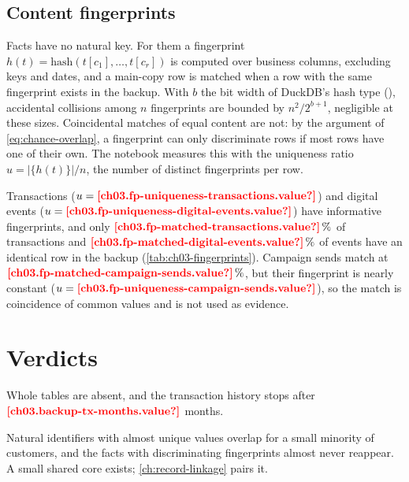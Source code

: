 

\subsection{Content fingerprints}

Facts have no natural key. For them a fingerprint $h(t) = \mathrm{hash}(t[c_1], \dots, t[c_r])$ is computed over
business columns, excluding keys and dates, and a main-copy row is matched when a row with the same fingerprint exists
in the backup. With $b$ the bit width of DuckDB's hash type (), accidental collisions among $n$
fingerprints are bounded by $n^2 / 2^{b+1}$, negligible at these sizes. Coincidental matches of equal content are not:
by the argument of \cref{eq:chance-overlap}, a fingerprint can only discriminate rows if most rows have one of their
own. The notebook measures this with the uniqueness ratio $u = \lvert\{h(t)\}\rvert / n$, the number of distinct
fingerprints per row.

Transactions ($u = \est{ch03.fp-uniqueness-transactions}{value}$) and digital events
($u = \est{ch03.fp-uniqueness-digital-events}{value}$) have informative fingerprints, and only
$\est{ch03.fp-matched-transactions}{value}\,\%$ of transactions and $\est{ch03.fp-matched-digital-events}{value}\,\%$
of events have an identical row in the backup (\cref{tab:ch03-fingerprints}). Campaign sends match at
$\est{ch03.fp-matched-campaign-sends}{value}\,\%$, but their fingerprint is nearly constant
($u = \est{ch03.fp-uniqueness-campaign-sends}{value}$), so the match is coincidence of common values and is not used
as evidence.



\section{Verdicts}\label{sec:inv-verdicts}

\begin{description}[style=nextline]
  \item[\ident{H4}, the backup is incomplete: supported.] Whole tables are absent, and the transaction history stops
  after $\est{ch03.backup-tx-months}{value}$ months.
  \item[\ident{H2}, the backup re-keys the same entities: rejected.] Natural identifiers with almost unique values
  overlap for a small minority of customers, and the facts with discriminating fingerprints almost never reappear.
  A small shared core exists; \cref{ch:record-linkage} pairs it.
\end{description}

